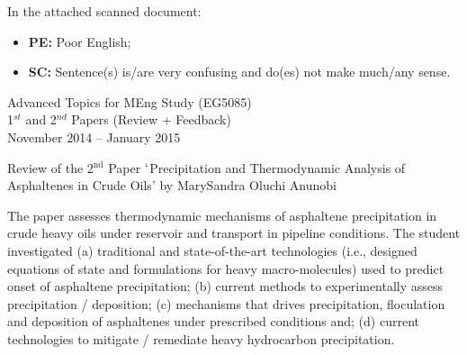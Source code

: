 \documentclass[14pt,twoside]{report}
\begin{document}
In the attached scanned document:
\begin{itemize}
\item {\bf PE:} Poor English;
\item {\bf SC:} Sentence(s) is/are very confusing and do(es) not make much/any sense.   
\end{itemize}
\medskip

\clearpage


\begin{center}
\Huge{Advanced Topics for MEng Study (EG5085)}\\
\huge{1$^{st}$ and 2$^{nd}$ Papers (Review + Feedback)}\\
\huge{November 2014 --  January 2015}
\end{center}

\vfill

\clearpage


\bigskip

\begin{center}
  {\Large Review of the 2$^{\text{nd}}$ Paper $\lq$Precipitation and Thermodynamic Analysis of Asphaltenes in Crude Oils' by MarySandra Oluchi Anunobi}
\end{center}

The paper assesses thermodynamic mechanisms of asphaltene precipitation in crude heavy oils under reservoir and transport in pipeline conditions. The student investigated (a) traditional and state-of-the-art technologies (i.e., designed equations of state and formulations for heavy macro-molecules) used to predict onset of asphaltene precipitation; (b) current methods to experimentally assess precipitation / deposition; (c) mechanisms that drives precipitation, floculation and deposition of asphaltenes under prescribed conditions and; (d) current technologies to mitigate / remediate heavy hydrocarbon precipitation.
\end{document}
